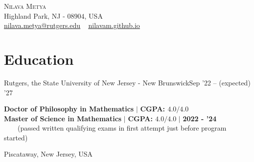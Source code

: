 
\usepackage{tabto}
\usepackage{setspace}
\usepackage{etaremune}
\usepackage{xcolor}
\newcommand*\circled[1]{\tikz[baseline=(char.base)]{
            \node[shape=circle,draw,inner sep=1pt, line width=1.1pt] (char) {#1};}}






\begin{center}\vspace{-25pt}
    {\Huge \scshape Nilava Metya} \\ %
    Highland Park, NJ - $08904$, USA\\
{\small 
\href{mailto:nilava.metya@rutgers.edu}{\circled{\scriptsize\faEnvelope}  \underline{nilava.metya@rutgers.edu}} ~ 
{\circled{\scriptsize\faHome} \underline{\url{nilavam.github.io}}}}
\end{center}



\section{Education}
\resumeSubheading
{Rutgers, the State University of New Jersey - New Brunswick}{Sep '22 -- (expected) '27}
{\begin{minipage}{15cm} \color{grey}\textbf{Doctor of Philosophy in Mathematics}  $|$ \textbf{CGPA: $4.0/4.0$}\\
\textbf{Master of Science in Mathematics}  $|$ \textbf{CGPA: $4.0/4.0$} $|$ \textbf{\color{black}2022 - '24}\\
$\phantom{\qquad}$(passed written qualifying exams in first attempt just before program started) \end{minipage}
}{Piscataway, New Jersey, USA}
\vspace{-7pt}

